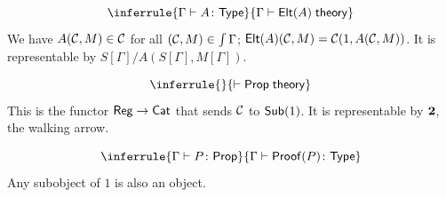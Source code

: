\documentclass{article}
\begin{document}
\begin{ttrule}
\[\inferrule{\Gamma \yields A \colon \ms{Type}}{\Gamma \yields \ms{Elt}(A) \jdg{theory}}\]
We have $A(\mathcal{C},M) \in \mathcal{C}$ for all $(\mathcal{C},M) \in \int \Gamma$; $\mathsf{Elt}(A)(\mathcal{C},M) = \mathcal{C}(1, A(\mathcal{C},M))$. It is representable by $S[\Gamma]/A(S[\Gamma], M[\Gamma])$.
\end{ttrule}

\begin{ttrule}
\[\inferrule{}{\yields \ms{Prop} \jdg{theory}}\]
This is the functor $\mathsf{Reg} \to \mathsf{Cat}$ that sends $\mathcal{C}$ to $\mathsf{Sub}(1)$. It is representable by $\mathbf{2}$, the walking arrow.
\end{ttrule}

\begin{ttrule}
  \[\inferrule{\Gamma \yields P \colon \ms{Prop}}{\Gamma \yields \ms{Proof}(P) \colon \ms{Type}}\]
  Any subobject of $1$ is also an object.
\end{ttrule}

\begin{ttrule}
\end{ttrule}
\end{document}
